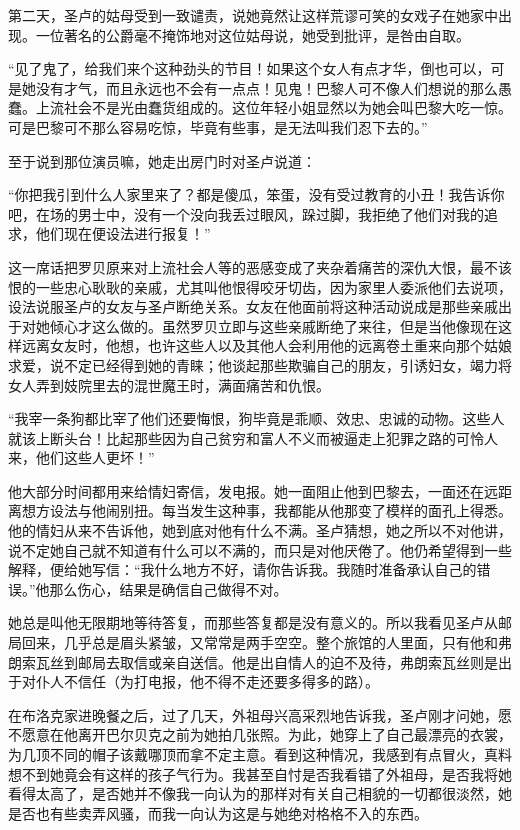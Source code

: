 \par 第二天，圣卢的姑母受到一致谴责，说她竟然让这样荒谬可笑的女戏子在她家中出现。一位著名的公爵毫不掩饰地对这位姑母说，她受到批评，是咎由自取。
\par “见了鬼了，给我们来个这种劲头的节目！如果这个女人有点才华，倒也可以，可是她没有才气，而且永远也不会有一点点！见鬼！巴黎人可不像人们想说的那么愚蠢。上流社会不是光由蠢货组成的。这位年轻小姐显然以为她会叫巴黎大吃一惊。可是巴黎可不那么容易吃惊，毕竟有些事，是无法叫我们忍下去的。”
\par 至于说到那位演员嘛，她走出房门时对圣卢说道：
\par “你把我引到什么人家里来了？都是傻瓜，笨蛋，没有受过教育的小丑！我告诉你吧，在场的男士中，没有一个没向我丢过眼风，跺过脚，我拒绝了他们对我的追求，他们现在便设法进行报复！”
\par 这一席话把罗贝原来对上流社会人等的恶感变成了夹杂着痛苦的深仇大恨，最不该恨的一些忠心耿耿的亲戚，尤其叫他恨得咬牙切齿，因为家里人委派他们去说项，设法说服圣卢的女友与圣卢断绝关系。女友在他面前将这种活动说成是那些亲戚出于对她倾心才这么做的。虽然罗贝立即与这些亲戚断绝了来往，但是当他像现在这样远离女友时，他想，也许这些人以及其他人会利用他的远离卷土重来向那个姑娘求爱，说不定已经得到她的青睐；他谈起那些欺骗自己的朋友，引诱妇女，竭力将女人弄到妓院里去的混世魔王时，满面痛苦和仇恨。
\par “我宰一条狗都比宰了他们还要悔恨，狗毕竟是乖顺、效忠、忠诚的动物。这些人就该上断头台！比起那些因为自己贫穷和富人不义而被逼走上犯罪之路的可怜人来，他们这些人更坏！”
\par 他大部分时间都用来给情妇寄信，发电报。她一面阻止他到巴黎去，一面还在远距离想方设法与他闹别扭。每当发生这种事，我都能从他那变了模样的面孔上得悉。他的情妇从来不告诉他，她到底对他有什么不满。圣卢猜想，她之所以不对他讲，说不定她自己就不知道有什么可以不满的，而只是对他厌倦了。他仍希望得到一些解释，便给她写信：“我什么地方不好，请你告诉我。我随时准备承认自己的错误。”他那么伤心，结果是确信自己做得不对。
\par 她总是叫他无限期地等待答复，而那些答复都是没有意义的。所以我看见圣卢从邮局回来，几乎总是眉头紧皱，又常常是两手空空。整个旅馆的人里面，只有他和弗朗索瓦丝到邮局去取信或亲自送信。他是出自情人的迫不及待，弗朗索瓦丝则是出于对仆人不信任（为打电报，他不得不走还要多得多的路）。
\par 在布洛克家进晚餐之后，过了几天，外祖母兴高采烈地告诉我，圣卢刚才问她，愿不愿意在他离开巴尔贝克之前为她拍几张照。为此，她穿上了自己最漂亮的衣裳，为几顶不同的帽子该戴哪顶而拿不定主意。看到这种情况，我感到有点冒火，真料想不到她竟会有这样的孩子气行为。我甚至自忖是否我看错了外祖母，是否我将她看得太高了，是否她并不像我一向认为的那样对有关自己相貌的一切都很淡然，她是否也有些卖弄风骚，而我一向认为这是与她绝对格格不入的东西。
